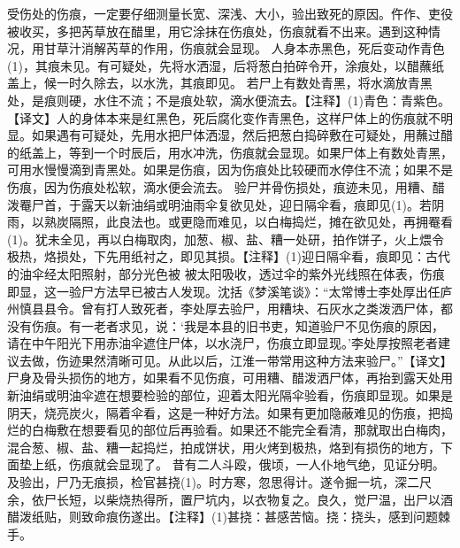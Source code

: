 \documentclass[12pt,UTF8]{ctexbook}
\begin{document}
受伤处的伤痕，一定要仔细测量长宽、深浅、大小，验出致死的原因。仵作、吏役被收买，多把芮草放在醋里，用它涂抹在伤痕处，伤痕就看不出来。遇到这种情况，用甘草汁消解芮草的作用，伤痕就会显现。
人身本赤黑色，死后变动作青色(1)，其痕未见。有可疑处，先将水洒湿，后将葱白拍碎令开，涂痕处，以醋蘸纸盖上，候一时久除去，以水洗，其痕即见。
若尸上有数处青黑，将水滴放青黑处，是痕则硬，水住不流；不是痕处软，滴水便流去。【注释】(1)青色：青紫色。【译文】人的身体本来是红黑色，死后腐化变作青黑色，这样尸体上的伤痕就不明显。如果遇有可疑处，先用水把尸体洒湿，然后把葱白捣碎敷在可疑处，用蘸过醋的纸盖上，等到一个时辰后，用水冲洗，伤痕就会显现。如果尸体上有数处青黑，可用水慢慢滴到青黑处。如果是伤痕，因为伤痕处比较硬而水停住不流；如果不是伤痕，因为伤痕处松软，滴水便会流去。
验尸并骨伤损处，痕迹未见，用糟、醋泼罨尸首，于露天以新油绢或明油雨伞复欲见处，迎日隔伞看，痕即见(1)。若阴雨，以熟炭隔照，此良法也。或更隐而难见，以白梅捣烂，摊在欲见处，再拥罨看(1)。犹未全见，再以白梅取肉，加葱、椒、盐、糟一处研，拍作饼子，火上煨令极热，烙损处，下先用纸衬之，即见其损。【注释】(1)迎日隔伞看，痕即见：古代的油伞经太阳照射，部分光色被
被太阳吸收，透过伞的紫外光线照在体表，伤痕即显，这一验尸方法早已被古人发现。沈括《梦溪笔谈》：“太常博士李处厚出任庐州慎县县令。曾有打人致死者，李处厚去验尸，用糟块、石灰水之类泼洒尸体，都没有伤痕。有一老者求见，说：‘我是本县的旧书吏，知道验尸不见伤痕的原因，请在中午阳光下用赤油伞遮住尸体，以水浇尸，伤痕立即显现。’李处厚按照老者建议去做，伤迹果然清晰可见。从此以后，江淮一带常用这种方法来验尸。”【译文】尸身及骨头损伤的地方，如果看不见伤痕，可用糟、醋泼洒尸体，再抬到露天处用新油绢或明油伞遮在想要检验的部位，迎着太阳光隔伞验看，伤痕即显现。如果是阴天，烧亮炭火，隔着伞看，这是一种好方法。如果有更加隐蔽难见的伤痕，把捣烂的白梅敷在想要看见的部位后再验看。如果还不能完全看清，那就取出白梅肉，混合葱、椒、盐、糟一起捣烂，拍成饼状，用火烤到极热，烙到有损伤的地方，下面垫上纸，伤痕就会显现了。
昔有二人斗殴，俄顷，一人仆地气绝，见证分明。及验出，尸乃无痕损，检官甚挠(1)。时方寒，忽思得计。遂令掘一坑，深二尺余，依尸长短，以柴烧热得所，置尸坑内，以衣物复之。良久，觉尸温，出尸以酒醋泼纸贴，则致命痕伤遂出。【注释】(1)甚挠：甚感苦恼。挠：挠头，感到问题棘手。
\end{document}
